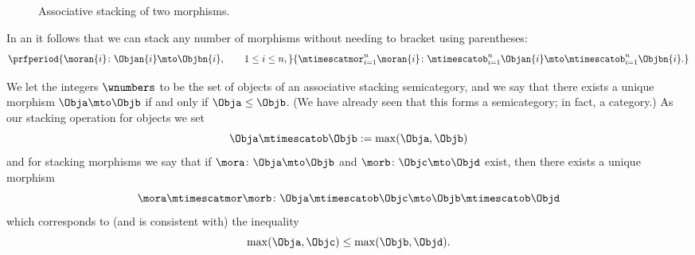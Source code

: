 \begin{marginfigure}
    \centering
    \caption{Associative stacking of three morphisms, in another order.}
    \label{fig:associative-stacking-2-new}
\end{marginfigure}

\begin{marginfigure}
    \centering
    \caption{Our string diagram notation for a triple stack.}
    \label{fig:triple-stacked}
\end{marginfigure}

\begin{figure}[h!]
    \centering
    \caption{Associative stacking of two morphisms.}
    \label{fig:double-stacked-new}
\end{figure}

\begin{remark}
    In an   it follows that we can stack any number of morphisms without needing to bracket using parentheses:
    \begin{equation}
        \prfperiod{
            \moran{i} \colon \Objan{i} \mto \Objbn{i}, \qquad 1 \leq i \leq n,
        }{
            \mtimescatmor_{i=1}^n \moran{i} \colon \mtimescatob_{i=1}^n \Objan{i} \mto \mtimescatob_{i=1}^n \Objbn{i}.
        }
    \end{equation}
\end{remark}

\begin{example}\label{ex:assoc-stacking-semicat-integers-max}
    We let the integers $\wnumbers$ to be the set of objects of an associative stacking semicategory, and we say that there exists a unique morphism $\Obja \mto \Objb$ if and only if $\Obja \leq \Objb$.
    (We have already seen that this forms a semicategory; in fact, a category.) As our stacking operation for objects we set
    \begin{equation}
        \Obja \mtimescatob \Objb := \max(\Obja, \Objb)
    \end{equation}
    and for stacking morphisms we say that if $\mora \colon \Obja \mto \Objb$ and $\morb \colon \Objc \mto \Objd$ exist, then there exists a unique morphism
    \begin{equation}
        \mora \mtimescatmor \morb \colon \Obja \mtimescatob \Objc \mto \Objb \mtimescatob \Objd
    \end{equation}
    which corresponds to (and is consistent with) the inequality
    \begin{equation}
        \max(\Obja, \Objc) \leq \max(\Objb, \Objd).
    \end{equation}
\end{example}

